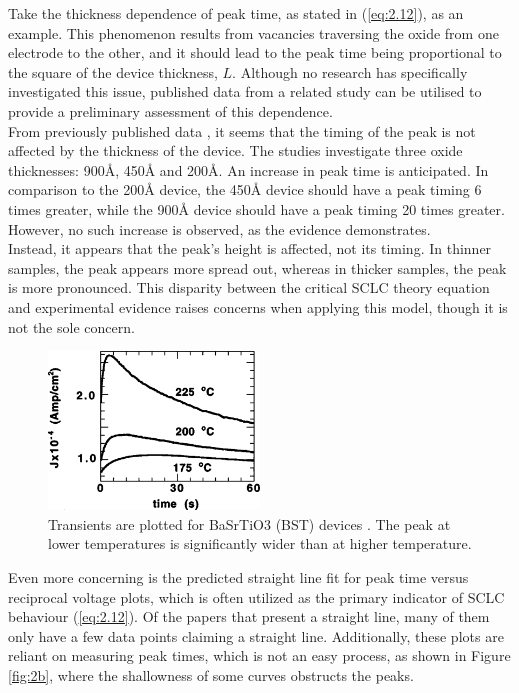 \noindent Take the thickness dependence of peak time, as stated in (\ref{eq:2.12}), as an example. This phenomenon results from vacancies traversing the oxide from one electrode to the other, and it should lead to the peak time being proportional to the square of the device thickness, $L$. Although no research has specifically investigated this issue, published data from a related study can be utilised to provide a preliminary assessment of this dependence.\\

\noindent From previously published data \cite{manceau2007current}, it seems that the timing of the peak is not affected by the thickness of the device. The studies investigate three oxide thicknesses: 900\r{A}, 450\r{A} and 200\r{A}. An increase in peak time is anticipated. In comparison to the 200\r{A} device, the 450\r{A} device should have a peak timing 6 times greater, while the 900\r{A} device should have a peak timing 20 times greater. However, no such increase is observed, as the evidence demonstrates.\\

\noindent Instead, it appears that the peak's height is affected, not its timing. In thinner samples, the peak appears more spread out, whereas in thicker samples, the peak is more pronounced. This disparity between the critical SCLC theory equation and experimental evidence raises concerns when applying this model, though it is not the sole concern.\\

\begin{figure}[htbp!] 
    \centering    
    \includegraphics[width=0.5\textwidth]{Chapter4/Figs/b.png}
    \caption[Transient's peak identification]{Transients are plotted for BaSrTiO3 (BST) devices \cite{boikov2002near}. The peak at lower temperatures is significantly wider than at higher temperature.}
    \label{fig:4b}
\end{figure}
    
\noindent Even more concerning is the predicted straight line fit for peak time versus reciprocal voltage plots, which is often utilized as the primary indicator of SCLC behaviour (\ref{eq:2.12}). Of the papers that present a straight line, many of them only have a few data points claiming a straight line. Additionally, these plots are reliant on measuring peak times, which is not an easy process, as shown in Figure \ref{fig:2b}, where the shallowness of some curves obstructs the peaks. \\

